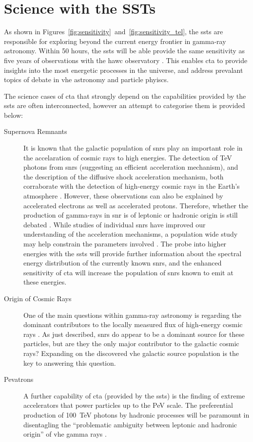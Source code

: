 \section{Science with the SSTs}

As shown in Figures~\ref{fig:sensitivity}~and~\ref{fig:sensitivity_tel}, the \glspl{sst} are responsible for exploring beyond the current energy frontier in gamma-ray astronomy. Within 50 hours, the \glspl{sst} will be able provide the same sensitivity as five years of observations with the \gls{hawc} observatory \cite{Consortium2018}. This enables \gls{cta} to provide insights into the most energetic processes in the universe, and address prevalant topics of debate in \gls{vhe} astronomy and particle phyiscs.

The science cases of \gls{cta} that strongly depend on the capabilities provided by the \glspl{sst} are often interconnected, however an attempt to categorise them is provided below:
\begin{description}
\item [Supernova Remnants] It is known that the galactic population of \glspl{snr} play an important role in the accelaration of cosmic rays to high energies. The detection of \si{TeV} photons from \glspl{snr} (suggesting an efficient acceleration mechanism), and the description of the diffusive shock acceleration mechanism, both corraborate with the detection of high-energy cosmic rays in the Earth's atmosphere \cite{Cristofari2017}. However, these observations can also be explained by accelerated electrons as well as accelerated protons. Therefore, whether the production of gamma-rays in \gls{snr} is of leptonic or hadronic origin is still debated \cite{Acharya2013}. While studies of individual \glspl{snr} have improved our understanding of the acceleration mechanisms, a population wide study may help constrain the parameters involved \cite{Cristofari2017}. The probe into higher energies with the \glspl{sst} will provide further information about the spectral energy distribution of the currently known \glspl{snr}, and the enhanced sensitivity of \gls{cta} will increase the population of \glspl{snr} known to emit at these energies.
\item [Origin of Cosmic Rays] One of the main questions within gamma-ray astronomy is regarding the dominant contributors to the locally measured flux of high-energy cosmic rays \cite{Bigongiari2016}. As just described, \glspl{snr} do appear to be a dominant source for these particles, but are they the only major contributor to the galactic cosmic rays? Expanding on the discovered \gls{vhe} galactic source population is the key to answering this question.
\item [Pevatrons] A further capability of \gls{cta} (provided by the \glspl{sst}) is the finding of extreme accelerators that power particles up to the \si{PeV} scale. The preferential production of \SI{100}{TeV} photons by hadronic processes will be paramount in disentagling the ``problematic ambiguity between leptonic and hadronic origin'' of \gls{vhe} gamma rays \cite[][p. 132]{Consortium2018}.
\end{description}